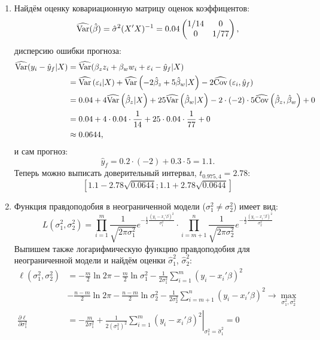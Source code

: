 \begin{enumerate}
\item Найдём оценку ковариационную матрицу оценок коэффицентов:
\[
\widehat {\operatorname{Var}}(\hat \beta) = \hat \sigma^2 (X'X)^{-1} = 0.04
\begin{pmatrix}
1/14 & 0 \\
0 & 1/77
\end{pmatrix},
\]
дисперсию ошибки прогноза:
\begin{align*}
\widehat {\operatorname{Var}}(y_i - \hat y_f | X) &=  \widehat{\operatorname{Var}}(\beta_z z_i + \beta_w w_i + \varepsilon_i - \hat y_f | X) \\
&= \widehat{\operatorname{Var}}\left(\varepsilon_i | X\right) + \widehat {\operatorname{Var}}\left(-2 \hat \beta_z + 5 \hat \beta_w  | X \right) - 2 \widehat {\operatorname{Cov}}\left(\varepsilon_i, \hat y_f\right) \\
&= 0.04 + 4 \widehat {\operatorname{Var}}\left(\hat \beta_z | X\right) + 25 \widehat {\operatorname{Var}}\left(\hat \beta_w | X\right) - 2 \cdot (-2) \cdot 5 \widehat {\operatorname{Cov}}\left(\hat \beta_z, \hat \beta_w\right) + 0 \\
&= 0.04 + 4 \cdot 0.04 \cdot \frac{1}{14} + 25 \cdot 0.04 \cdot \frac{1}{77} + 0 \\
&\approx 0.0644,
\end{align*}
и сам прогноз:
\[
\hat y_f = 0.2 \cdot (-2) + 0.3 \cdot 5 = 1.1.
\]
Теперь можно выписать доверительный интервал, $t_{0.975, 4} = 2.78$:
\[
\left[1.1 - 2.78 \sqrt{0.0644}; 1.1 + 2.78 \sqrt{0.0644}\right]
\]
\item Функция правдоподобия в неограниченной модели ($\sigma^2_1 \neq \sigma^2_2$)
имеет вид:
\[
L\left(\sigma^2_1, \sigma^2_2\right) = \prod_{i=1}^m \frac{1}{\sqrt{2\pi\sigma^2_1}} e^{-\frac{1}{2}\frac{\left(y_i - x_i'\beta\right)^2}{\sigma^2_1}}
\cdot \prod_{i=m+1}^n \frac{1}{\sqrt{2\pi\sigma^2_2}} e^{-\frac{1}{2}\frac{\left(y_i - x_i'\beta\right)^2}{\sigma^2_2}}
\]
Выпишем также логарифмическую функцию правдоподобия для неограниченной модели
и найдём оценки $\hat \sigma^2_1$, $\hat \sigma^2_2$:
\begin{align*}
\ell\left(\sigma^2_1, \sigma^2_2\right) &= -\frac{m}{2} \ln 2\pi - \frac{m}{2} \ln \sigma^2_1 -
\frac{1}{2\sigma^2_1} \sum_{i=1}^m \left(y_i - x_i'\beta\right)^2 \\
&- \frac{n-m}{2} \ln 2\pi - \frac{n-m}{2} \ln \sigma^2_2 -
\frac{1}{2\sigma^2_2} \sum_{i=m+1}^n \left(y_i - x_i' \beta\right)^2 \to \max_{\sigma^2_1, \sigma^2_2} \\
\frac{\partial \ell}{\partial \sigma^2_1} &= \left. -\frac{m}{2\sigma^2_1} + \frac{1}{2\left(\sigma^2_1\right)^2} \sum_{i=1}^m \left(y_i - x_i'\beta\right)^2 \right|_{\sigma^2_1 = \hat\sigma^2_1} = 0 \\

\end{align*}
\end{enumerate}
